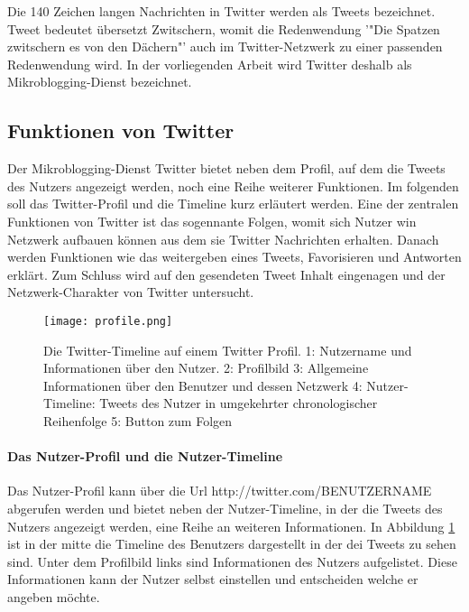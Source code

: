 			Die 140 Zeichen langen Nachrichten in Twitter werden als Tweets bezeichnet.
			Tweet bedeutet übersetzt Zwitschern, womit die Redenwendung '"Die Spatzen zwitschern es von den Dächern"' auch im Twitter-Netzwerk zu einer passenden Redenwendung  wird.  
			In der vorliegenden Arbeit wird Twitter deshalb als Mikroblogging-Dienst bezeichnet.
		

			\subsection{Funktionen von Twitter}
			Der Mikroblogging-Dienst Twitter bietet neben dem Profil, auf dem die Tweets des Nutzers angezeigt werden, noch eine Reihe weiterer Funktionen. 
			Im folgenden soll das Twitter-Profil und die Timeline kurz erläutert werden. 
			Eine der zentralen Funktionen von Twitter ist das sogennante Folgen, womit sich Nutzer win Netzwerk aufbauen können aus dem sie Twitter Nachrichten erhalten.
			Danach werden Funktionen wie das weitergeben eines Tweets, Favorisieren und Antworten erklärt. 
			Zum Schluss wird auf den gesendeten Tweet Inhalt eingenagen und der Netzwerk-Charakter von Twitter untersucht.

			\begin{figure}[h!]
			\begin{center}
			\texttt{[image: profile.png]}
			\caption{Die Twitter-Timeline auf einem Twitter Profil. 1: Nutzername und Informationen über den Nutzer. 2: Profilbild
			3: Allgemeine Informationen über den Benutzer und dessen Netzwerk
			4: Nutzer-Timeline: Tweets des Nutzer in umgekehrter chronologischer Reihenfolge 
			5: Button zum Folgen}
			\label{img:twitterProfile}
			\end{center}
			\end{figure}	


				\paragraph{Das Nutzer-Profil und die Nutzer-Timeline}
					Das Nutzer-Profil kann über die Url http://twitter.com/BENUTZERNAME abgerufen werden und bietet neben der Nutzer-Timeline, in der die Tweets des Nutzers angezeigt werden, eine Reihe an weiteren Informationen.
					In Abbildung \ref{img:twitterProfile} ist in der mitte die Timeline des Benutzers dargestellt in der dei Tweets zu sehen sind. 
					Unter dem Profilbild links sind Informationen des Nutzers aufgelistet.
					Diese Informationen kann der Nutzer selbst einstellen und entscheiden welche er angeben möchte.   


